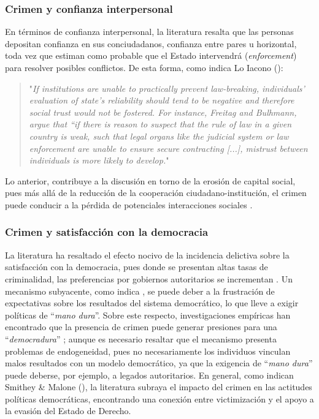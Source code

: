 \documentclass[letterpaper]{article}
\begin{document}
\subsubsection{Crimen y confianza interpersonal}

En términos de confianza interpersonal, la literatura resalta que las personas depositan confianza en sus conciudadanos, confianza entre pares u horizontal, toda vez que estiman como probable que el Estado intervendrá (\emph{enforcement}) para resolver posibles conflictos. De esta forma, como indica Lo Iacono (\citeyear{lo_iacono2019}):

\begin{quote}
"\emph{If institutions are unable to practically prevent law-breaking, individuals’ evaluation of state’s reliability should tend to be negative and therefore social trust would not be fostered. For instance, Freitag and Bulhmann, argue that “if there is reason to suspect that the rule of law in a given country is weak, such that legal organs like the judicial system or law enforcement are unable to ensure secure contracting [...], mistrust between individuals is more likely to develop.}"
\end{quote}

Lo anterior, contribuye a la discusión en torno de la erosión de capital social, pues más allá de la reducción de la cooperación ciudadano-institución, el crimen puede conducir a la pérdida de potenciales interacciones sociales \autocite{corbacho2015, corbacho2012, cozzubo2021, putnam1994, blanco2012, blanco2013b}.

\subsubsection{Crimen y satisfacción con la democracia}

La literatura ha resaltado el efecto nocivo de la incidencia delictiva sobre la satisfacción con la democracia, pues donde se presentan altas tasas de criminalidad, las preferencias por gobiernos autoritarios se incrementan \autocite{fernandez2010, ceobanu2010, malone2014}. Un mecanismo subyacente, como indica \autocite{blanco2012, blanco2013b}, se puede deber a la frustración de expectativas sobre los resultados del sistema democrático, lo que lleve a exigir políticas de “\emph{mano dura}”. Sobre este respecto, investigaciones empíricas han encontrado que la presencia de crimen puede generar presiones para una “\emph{democradura}” \autocite{malone2014}; aunque es necesario resaltar que el mecanismo presenta problemas de endogeneidad, pues no necesariamente los individuos vinculan malos resultados con un modelo democrático, ya que la exigencia de “\emph{mano dura}” puede deberse, por ejemplo, a legados autoritarios. En general, como indican Smithey \& Malone (\citeyear{malone2014}), la literatura subraya el impacto del crimen en las actitudes políticas democráticas, encontrando una conexión entre victimización y el apoyo a la evasión del Estado de Derecho. 
\end{document}
